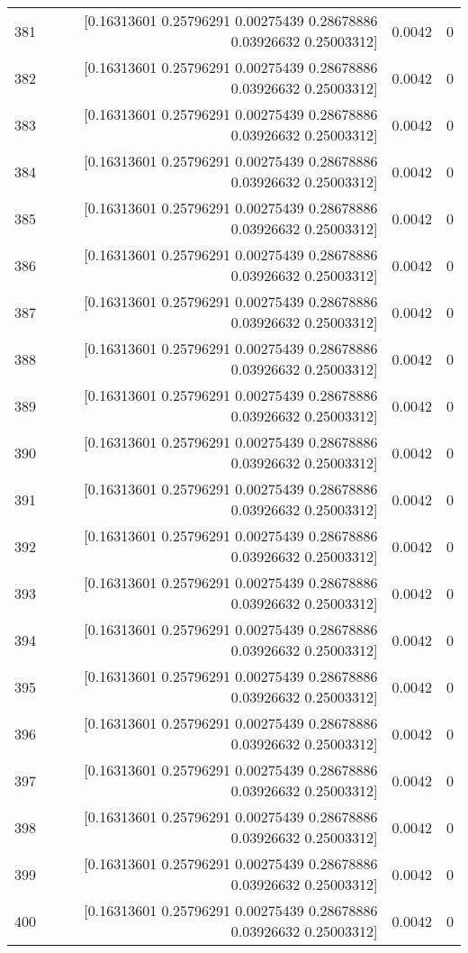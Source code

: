 \begin{longtable}{lrrr}
381 & [0.16313601 0.25796291 0.00275439 0.28678886 0.03926632 0.25003312] & 0.0042 & 0 \\
382 & [0.16313601 0.25796291 0.00275439 0.28678886 0.03926632 0.25003312] & 0.0042 & 0 \\
383 & [0.16313601 0.25796291 0.00275439 0.28678886 0.03926632 0.25003312] & 0.0042 & 0 \\
384 & [0.16313601 0.25796291 0.00275439 0.28678886 0.03926632 0.25003312] & 0.0042 & 0 \\
385 & [0.16313601 0.25796291 0.00275439 0.28678886 0.03926632 0.25003312] & 0.0042 & 0 \\
386 & [0.16313601 0.25796291 0.00275439 0.28678886 0.03926632 0.25003312] & 0.0042 & 0 \\
387 & [0.16313601 0.25796291 0.00275439 0.28678886 0.03926632 0.25003312] & 0.0042 & 0 \\
388 & [0.16313601 0.25796291 0.00275439 0.28678886 0.03926632 0.25003312] & 0.0042 & 0 \\
389 & [0.16313601 0.25796291 0.00275439 0.28678886 0.03926632 0.25003312] & 0.0042 & 0 \\
390 & [0.16313601 0.25796291 0.00275439 0.28678886 0.03926632 0.25003312] & 0.0042 & 0 \\
391 & [0.16313601 0.25796291 0.00275439 0.28678886 0.03926632 0.25003312] & 0.0042 & 0 \\
392 & [0.16313601 0.25796291 0.00275439 0.28678886 0.03926632 0.25003312] & 0.0042 & 0 \\
393 & [0.16313601 0.25796291 0.00275439 0.28678886 0.03926632 0.25003312] & 0.0042 & 0 \\
394 & [0.16313601 0.25796291 0.00275439 0.28678886 0.03926632 0.25003312] & 0.0042 & 0 \\
395 & [0.16313601 0.25796291 0.00275439 0.28678886 0.03926632 0.25003312] & 0.0042 & 0 \\
396 & [0.16313601 0.25796291 0.00275439 0.28678886 0.03926632 0.25003312] & 0.0042 & 0 \\
397 & [0.16313601 0.25796291 0.00275439 0.28678886 0.03926632 0.25003312] & 0.0042 & 0 \\
398 & [0.16313601 0.25796291 0.00275439 0.28678886 0.03926632 0.25003312] & 0.0042 & 0 \\
399 & [0.16313601 0.25796291 0.00275439 0.28678886 0.03926632 0.25003312] & 0.0042 & 0 \\
400 & [0.16313601 0.25796291 0.00275439 0.28678886 0.03926632 0.25003312] & 0.0042 & 0 \\

\end{longtable}
